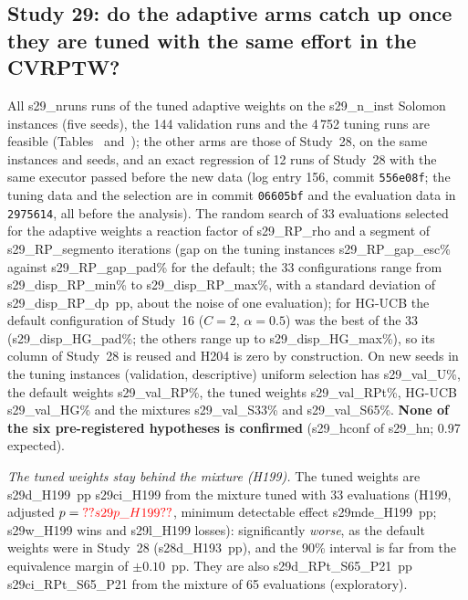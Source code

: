 


\subsection{Study 29: do the adaptive arms catch up once they are tuned with the same effort in the CVRPTW?}\label{sec:s29}
All \num{s29_nruns} runs of the tuned adaptive weights on the \num{s29_n_inst} Solomon instances (five seeds), the 144 validation runs and the 4\,752 tuning runs are feasible (Tables~ and~); the other arms are those of Study~28, on the same instances and seeds, and an exact regression of 12 runs of Study~28 with the same executor passed before the new data (log entry 156, commit \texttt{556e08f}; the tuning data and the selection are in commit \texttt{06605bf} and the evaluation data in \texttt{2975614}, all before the analysis). The random search of 33 evaluations selected for the adaptive weights a reaction factor of \num{s29_RP_rho} and a segment of \num{s29_RP_segmento} iterations (gap on the tuning instances \num{s29_RP_gap_esc}\% against \num{s29_RP_gap_pad}\% for the default; the 33 configurations range from \num{s29_disp_RP_min}\% to \num{s29_disp_RP_max}\%, with a standard deviation of \num{s29_disp_RP_dp}~pp, about the noise of one evaluation); for HG-UCB the default configuration of Study~16 ($C=2$, $\alpha=0.5$) was the best of the 33 (\num{s29_disp_HG_pad}\%; the others range up to \num{s29_disp_HG_max}\%), so its column of Study~28 is reused and H204 is zero by construction. On new seeds in the tuning instances (validation, descriptive) uniform selection has \num{s29_val_U}\%, the default weights \num{s29_val_RP}\%, the tuned weights \num{s29_val_RPt}\%, HG-UCB \num{s29_val_HG}\% and the mixtures \num{s29_val_S33}\% and \num{s29_val_S65}\%. \textbf{None of the six pre-registered hypotheses is confirmed} (\num{s29_hconf} of \num{s29_hn}; 0.97 expected).

\emph{The tuned weights stay behind the mixture (H199).} The tuned weights are \num{s29d_H199}~pp \num{s29ci_H199} from the mixture tuned with 33 evaluations (H199, adjusted $p=\num{s29p_H199}$, minimum detectable effect \num{s29mde_H199}~pp; \num{s29w_H199} wins and \num{s29l_H199} losses): significantly \emph{worse}, as the default weights were in Study~28 (\num{s28d_H193}~pp), and the 90\% interval is far from the equivalence margin of $\pm0.10$~pp. They are also \num{s29d_RPt_S65_P21}~pp \num{s29ci_RPt_S65_P21} from the mixture of 65 evaluations (exploratory).

